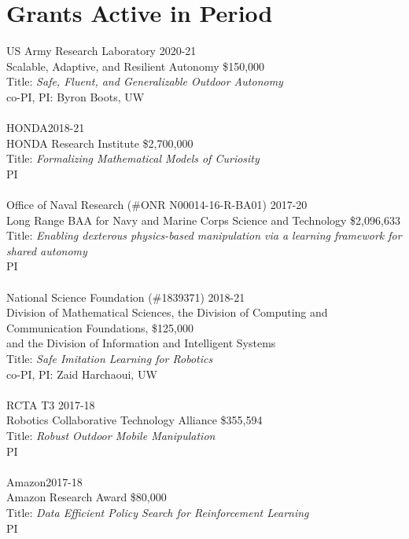 \documentclass[10pt]{article}
\begin{document}
\section{Grants Active in Period}
\noindent
US Army Research Laboratory \hfill 2020-21\\
Scalable, Adaptive, and Resilient Autonomy \hfill \$150,000\\
Title: \textit{Safe, Fluent, and Generalizable Outdoor Autonomy} \\
co-PI, PI: Byron Boots, UW\\
\\
HONDA\hfill 2018-21\\
HONDA Research Institute \hfill \$2,700,000\\
Title: \textit{Formalizing Mathematical Models of Curiosity}\\
PI\\
\\
Office of Naval Research (\#ONR N00014-16-R-BA01) \hfill 2017-20\\
Long Range BAA for Navy and Marine Corps Science and Technology \hfill \$2,096,633 \\
Title: \textit{Enabling dexterous physics-based manipulation via a learning framework for shared autonomy}\\
PI\\
\\
National Science Foundation (\#1839371) \hfill 2018-21\\
Division of Mathematical Sciences, the Division of Computing and Communication Foundations, \hfill \$125,000
\\and the Division of Information and Intelligent Systems\\
Title: \textit{Safe Imitation Learning for Robotics}\\
co-PI, PI: Zaid Harchaoui, UW\\
\\
RCTA T3 \hfill 2017-18\\
Robotics Collaborative Technology Alliance \hfill \$355,594\\
Title: \textit{Robust Outdoor Mobile Manipulation}\\
PI\\
\\
Amazon\hfill 2017-18\\
Amazon Research Award \hfill \$80,000\\
Title: \textit{Data Efficient Policy Search for Reinforcement Learning}\\
PI\\
\end{document}
